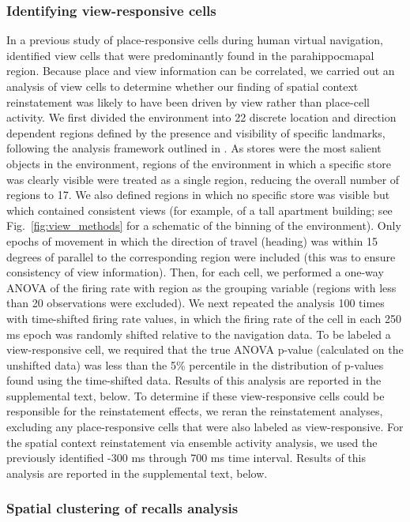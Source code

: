 \subsubsection*{Identifying view-responsive cells}
In a previous study of  place-responsive cells during human virtual navigation, \cite{EkstEtal03} identified view cells that were predominantly found in the parahippocmapal region.  Because place and view information can be correlated, we carried out an analysis of view cells to determine whether our finding of spatial context reinstatement was likely to have been driven by view rather than place-cell activity.  We first divided the environment into 22 discrete location and direction dependent regions defined by the presence and visibility of specific landmarks, following the analysis framework outlined in \cite{EkstEtal03}. As stores were the most salient objects in the environment, regions of the environment in which a specific store was clearly visible were treated as a single region, reducing the overall number of regions to 17. We also defined regions  in which no specific store was visible but which contained consistent views (for example, of a tall apartment building; see Fig.~\ref{fig:view_methods} for a schematic of the binning of the environment).  Only epochs of movement in which the direction of travel (heading) was within 15 degrees of parallel to the corresponding region were included (this was to ensure consistency of view information).  Then, for each cell, we performed a one-way ANOVA of the firing rate with region as the grouping variable (regions with less than 20 observations were excluded). We next repeated the analysis 100 times with time-shifted firing rate values, in which the firing rate of the cell in each 250 ms epoch was randomly shifted relative to the navigation data.  To be labeled a view-responsive cell, we required that the true ANOVA p-value (calculated on the unshifted data) was less than the 5\% percentile in the distribution of p-values found using the time-shifted data.  Results of this analysis are reported in the supplemental text, below.  To determine if these view-responsive cells could be responsible for the reinstatement effects, we reran the reinstatement analyses, excluding any place-responsive cells that were also labeled as view-responsive. For the spatial context reinstatement via ensemble activity analysis, we used the previously identified -300 ms through 700 ms time interval.  Results of this analysis are reported in the supplemental text, below.

\subsubsection*{Spatial clustering of recalls analysis}

